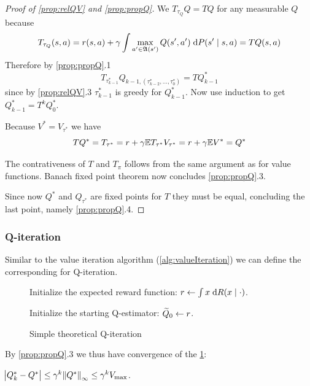 \begin{proof}[Proof of \cref{prop:relQV} and \cref{prop:propQ}]
    We $T_{\tau_Q} Q = T Q$ for any measurable $Q$ because
  \[ T_{\tau_Q}(s, a) = r(s, a) + \gamma \int \max_{a' \in \frak{A}(s')} Q(s', a')
  \; \mathrm{d} P(s' \mid s, a) = TQ(s, a) \]
  Therefore by \cref{prop:propQ}.1
  \[ T_{\tau_{k-1}^*} Q_{k-1, (\tau_{k-2}^*, \dots, \tau_0^*)}
  = T Q_{k-1}^* \]
  since by \cref{prop:relQV}.3 $\tau_{k-1}^*$ is greedy for $Q_{k-1}^*$.
  Now use induction to get $Q^*_{k-1} = T^k Q_0^*$.

  Because $V^* = V_{\tau^*}$ we have
  \[ TQ^* = T_{\tau^*} = r + \gamma \mathbb{E} T_{\tau^*} V_{\tau^*}
  = r + \gamma \mathbb{E} V^* = Q^* \]

  The contrativeness of $T$ and $T_\pi$ follows from the same argument as for
  value functions.
  Banach fixed point theorem now concludes \cref{prop:propQ}.3.

  Since now $Q^*$ and $Q_{\tau^*}$ are fixed points for $T$ they must be
  equal, concluding the last point, namely \cref{prop:propQ}.4.
\end{proof}

\subsubsection{Q-iteration}

Similar to the value iteration algorithm (\cref{alg:valueIteration}) we can
define the corresponding for Q-iteration.

\begin{figure}[H]
\begin{algorithm}[H] %
\caption{Simple theoretical Q-iteration}
Initialize the expected reward function:
$r \leftarrow \int x \; \mathrm{d} R(x \mid \cdot)$.

Initialize the starting Q-estimator: $\widetilde{Q}_0 \leftarrow r$.

\label{alg:theoSimpleQ}
\end{algorithm}
\end{figure}

By \cref{prop:propQ}.3 we thus have convergence of the \cref{alg:theoSimpleQ}:
\begin{cor}
  $\abs{Q^*_k - Q^*} \leq \gamma^k \norm{Q^*}_\infty
  \leq \gamma^k V_{\max}$.
  \label{prop:theoSimpleQConv}
\end{cor}

